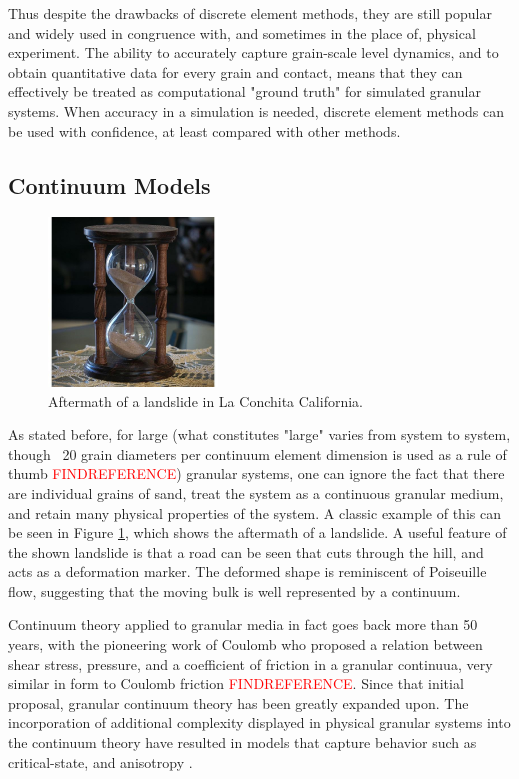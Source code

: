Thus despite the drawbacks of discrete element methods, they are still popular and widely used in congruence with, and sometimes in the place of, physical experiment. The ability to accurately capture grain-scale level dynamics, and to obtain quantitative data for every grain and contact, means that they can effectively be treated as computational "ground truth" for simulated granular systems. When accuracy in a simulation is needed, discrete element methods can be used with confidence, at least compared with other methods.

\subsection{Continuum Models}
\begin{figure}[htp] 
    \centering
    \includegraphics[width=0.4\textwidth]{figs/hourglass_whole.jpg}
    \caption{Aftermath of a landslide in La Conchita California.}
    \label{landslide}
\end{figure}

As stated before, for large (what constitutes "large" varies from system to system, though ~20 grain diameters per continuum element dimension is used as a rule of thumb \textcolor{red}{FINDREFERENCE}) granular systems, one can ignore the fact that there are individual grains of sand, treat the system as a continuous granular medium, and retain many physical properties of the system. A classic example of this can be seen in Figure \ref{landslide}, which shows the aftermath of a landslide. A useful feature of the shown landslide is that a road can be seen that cuts through the hill, and acts as a deformation marker. The deformed shape is reminiscent of Poiseuille flow, suggesting that the moving bulk is well represented by a continuum.

Continuum theory applied to granular media in fact goes back more than 50 years, with the pioneering work of Coulomb who proposed a relation between shear stress, pressure, and a coefficient of friction in a granular continuua, very similar in form to Coulomb friction \textcolor{red}{FINDREFERENCE}. Since that initial proposal, granular continuum theory has been greatly expanded upon. The incorporation of additional complexity displayed in physical granular systems into the continuum theory have resulted in models that capture behavior such as critical-state, and anisotropy \cite{Schofield:1968:Critical}\cite{Dafalias:2004:Sand}.

